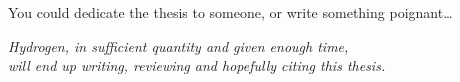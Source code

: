 
\thispagestyle{empty}

\vspace*{\fill}

\begin{flushright}
You could dedicate the thesis to someone, or write something poignant\dots


    \emph{Hydrogen, in sufficient quantity and given enough time,\\
        will end up writing, reviewing and hopefully citing this thesis.}
 \end{flushright}

\vspace*{\fill}

